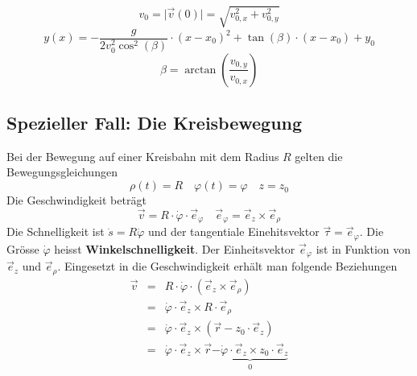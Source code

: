 \begin{equation}
\boxed{v_0=\Big\vert\overrightarrow{v}\left(0\right)\Big\vert=\sqrt{v_{0,x}^2+v_{0,y}^2}}
\end{equation}
\begin{equation}
\boxed{y\left(x\right)=-\dfrac{g}{2v_0^2\cos^2\left(\beta\right)}\cdot \left(x-x_0\right)^2+\tan\left(\beta\right)\cdot \left(x-x_0\right)+y_0}
\end{equation}
\begin{equation}
\boxed{\beta=\arctan\left(\dfrac{v_{0,y}}{v_{0,x}}\right)}
\end{equation}
\subsection{Spezieller Fall: Die Kreisbewegung}
Bei der Bewegung auf einer Kreisbahn mit dem Radius $R$ gelten die Bewegungsgleichungen
\begin{equation} 
\boxed{\rho\left(t\right)=R}\quad \boxed{\varphi\left(t\right)=\varphi}\quad \boxed{z=z_0}
\end{equation} 
Die Geschwindigkeit beträgt
\begin{equation}
\boxed{\overrightarrow{v}=R\cdot \dot{\varphi}\cdot \overrightarrow{e}_{\varphi}}\quad \boxed{\overrightarrow{e}_{\varphi}=\overrightarrow{e}_z\times \overrightarrow{e}_\rho}
\end{equation} 
Die Schnelligkeit ist $\dot{s}=R\dot{\varphi}$ und der tangentiale Einehitsvektor $\overrightarrow{\tau}=\overrightarrow{e}_{\varphi}$. Die Grösse $\dot{\varphi}$ heisst \textbf{Winkelschnelligkeit}. Der Einheitsvektor $\overrightarrow{e}_{\varphi}$ ist in Funktion von $\overrightarrow{e}_z$ und $\overrightarrow{e}_{\rho}$. Eingesetzt in die Geschwindigkeit erhält man folgende Beziehungen
\begin{equation}
\boxed{\begin{array}{lll}
\overrightarrow{v}&=&R\cdot \dot{\varphi}\cdot \left(\overrightarrow{e}_z\times \overrightarrow{e}_{\rho}\right)\\
&=&\dot{\varphi}\cdot \overrightarrow{e}_z\times R\cdot \overrightarrow{e}_{\rho}\\
&=&\dot{\varphi}\cdot \overrightarrow{e}_z\times \left(\overrightarrow{r}-z_0\cdot \overrightarrow{e}_z\right)\\
&=&\dot{\varphi}\cdot \overrightarrow{e}_z\times \overrightarrow{r}\underbrace{-\dot{\varphi}\cdot \overrightarrow{e}_z\times z_0\cdot \overrightarrow{e}_z}_{0}\\
\end{array}}
\end{equation}
